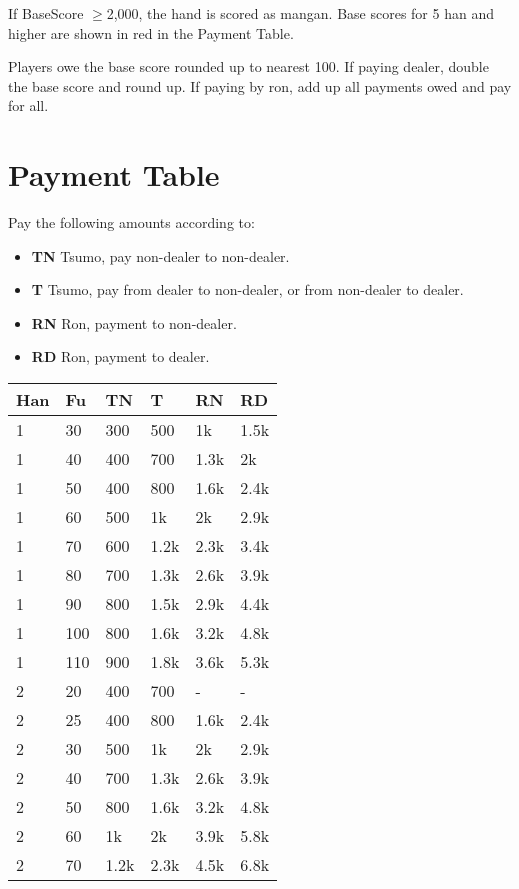 \documentclass[8pt,a4paper]{extarticle}
\begin{document}
\begin{multicols*}{5}
If BaseScore $\geq$2,000, the hand is scored as mangan. Base scores for 5 han and higher are shown in \color{Red}red \color{Black}in the Payment Table.

\smallskip 

Players owe the base score rounded up to nearest 100. If paying dealer, double the base score and round up. If paying by ron, add up all payments owed and pay for all.

\section*{Payment Table}
Pay the following amounts according to:
\begin{itemize}[nolistsep,leftmargin=1em]
    \item \textbf{TN} Tsumo, pay non-dealer to non-dealer.
    \item \textbf{T} Tsumo, pay from dealer to non-dealer, or from non-dealer to dealer.
    \item \textbf{RN} Ron, payment to non-dealer.
    \item \textbf{RD} Ron, payment to dealer.
\end{itemize}
\small
\begin{tabularx}{\columnwidth}{llXXXX}
\toprule
Han & Fu & TN & T & RN & RD \\ \midrule
1 & 30 & 300 & 500 & 1k & 1.5k \\
1 & 40 & 400 & 700 & 1.3k & 2k \\
1 & 50 & 400 & 800 & 1.6k & 2.4k \\
1 & 60 & 500 & 1k & 2k & 2.9k \\
1 & 70 & 600 & 1.2k & 2.3k & 3.4k \\
1 & 80 & 700 & 1.3k & 2.6k & 3.9k \\
1 & 90 & 800 & 1.5k & 2.9k & 4.4k \\
1 & 100 & 800 & 1.6k & 3.2k & 4.8k \\
1 & 110 & 900 & 1.8k & 3.6k & 5.3k \\
2 & 20 & 400 & 700 & - & - \\
2 & 25 & 400 & 800 & 1.6k & 2.4k \\
2 & 30 & 500 & 1k & 2k & 2.9k \\
2 & 40 & 700 & 1.3k & 2.6k & 3.9k \\
2 & 50 & 800 & 1.6k & 3.2k & 4.8k \\
2 & 60 & 1k & 2k & 3.9k & 5.8k \\
2 & 70 & 1.2k & 2.3k & 4.5k & 6.8k \\

\end{tabularx}
\end{multicols*}
\end{document}
